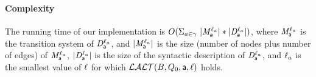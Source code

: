 
\paragraph{Complexity} The running  time of our implementation is
$O(\Sigma_{a \in \gamma}\  |\mathit{M}_{\mathsf{a}}^{\ell_a}| * |\mathit{D}_{\mathsf{a}}^{\ell_a}|)$, 
where 
$\mathit{M}_{\mathsf{a}}^{\ell_a}$ is the transition system of
$\mathit{D}_{\mathsf{a}}^{\ell_a}$, and $|\mathit{M}_{\mathsf{a}}^{\ell_a}|$ is the size (number of nodes plus number of edges) of 
$\mathit{M}_{\mathsf{a}}^{\ell_a}$, 
$|\mathit{D}_{\mathsf{a}}^{\ell_a}|$ is the size of the syntactic description of $\mathit{D}_{\mathsf{a}}^{\ell_a}$, and 
$\ell_a$ is the smallest value of $\ell$ for which $\mathcal{LALT}(B, Q_0, \mathsf{a}, \ell)$ holds.


